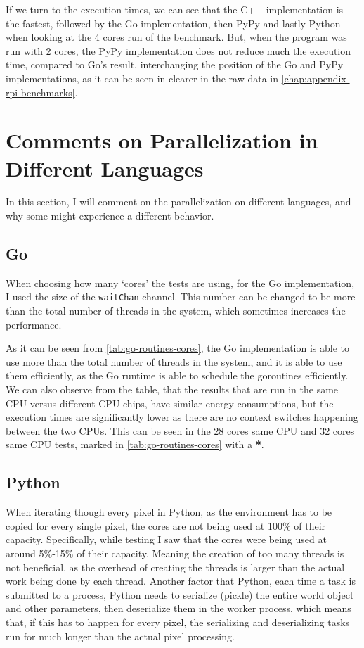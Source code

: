 If we turn to the execution times, we can see that the C++ implementation is the fastest, followed by the Go implementation, then PyPy and lastly Python when looking at the 4 cores run of the benchmark. But, when the program was run with 2 cores, the PyPy implementation does not reduce much the execution time, compared to Go's result, interchanging the position of the Go and PyPy implementations, as it can be seen in clearer in the raw data in \autoref{chap:appendix-rpi-benchmarks}.

\FloatBarrier
\section{Comments on Parallelization in Different Languages}

In this section, I will comment on the parallelization on different languages, and why some might experience a different behavior. 

\subsection{Go}
When choosing how many `cores' the tests are using, for the Go implementation, I used the size of the \texttt{waitChan} channel. This number can be changed to be more than the total number of threads in the system, which sometimes increases the performance.



As it can be seen from \autoref{tab:go-routines-cores}, the Go implementation is able to use more than the total number of threads in the system, and it is able to use them efficiently, as the Go runtime is able to schedule the goroutines efficiently. We can also observe from the table, that the results that are run in the same CPU versus different CPU chips, have similar energy consumptions, but the execution times are significantly lower as there are no context switches happening between the two CPUs. This can be seen in the 28 cores same CPU and 32 cores same CPU tests, marked in \autoref{tab:go-routines-cores} with a \textbf{*}.

\subsection{Python}
When iterating though every pixel in Python, as the environment has to be copied for every single pixel, the cores are not being used at 100\% of their capacity. Specifically, while testing I saw that the cores were being used at around 5\%-15\% of their capacity. Meaning the creation of too many threads is not beneficial, as the overhead of creating the threads is larger than the actual work being done by each thread. 
Another factor that Python, each time a task is submitted to a process, Python needs to serialize (pickle) the entire world object and other parameters, then deserialize them in the worker process, which means that, if this has to happen for every pixel, the serializing and deserializing tasks run for much longer than the actual pixel processing.

